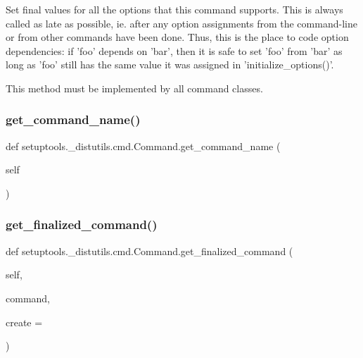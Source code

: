 \begin{DoxyVerb}Set final values for all the options that this command supports.
This is always called as late as possible, ie.  after any option
assignments from the command-line or from other commands have been
done.  Thus, this is the place to code option dependencies: if
'foo' depends on 'bar', then it is safe to set 'foo' from 'bar' as
long as 'foo' still has the same value it was assigned in
'initialize_options()'.

This method must be implemented by all command classes.
\end{DoxyVerb}
 \mbox{\label{classsetuptools_1_1__distutils_1_1cmd_1_1Command_acb4b402ef96611a7b0fbf717ffbb3807}} 
\subsubsection{\texorpdfstring{get\+\_\+command\+\_\+name()}{get\_command\_name()}}
{\footnotesize\ttfamily def setuptools.\+\_\+distutils.\+cmd.\+Command.\+get\+\_\+command\+\_\+name (\begin{DoxyParamCaption}\item[{}]{self }\end{DoxyParamCaption})}

\mbox{\label{classsetuptools_1_1__distutils_1_1cmd_1_1Command_a09d3bf8e912072dce360a2e78d28cd75}} 
\subsubsection{\texorpdfstring{get\+\_\+finalized\+\_\+command()}{get\_finalized\_command()}}
{\footnotesize\ttfamily def setuptools.\+\_\+distutils.\+cmd.\+Command.\+get\+\_\+finalized\+\_\+command (\begin{DoxyParamCaption}\item[{}]{self,  }\item[{}]{command,  }\item[{}]{create = {} }\end{DoxyParamCaption})}

